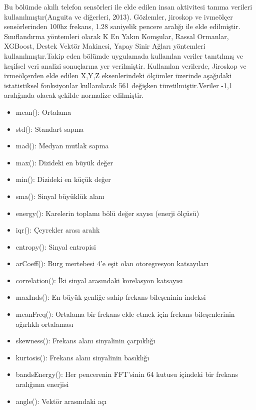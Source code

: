 \documentclass[12pt,twoside]{deuthesis}
\providecommand{\tightlist}{%
  \setlength{\itemsep}{0pt}\setlength{\parskip}{0pt}}
\begin{document}
Bu bölümde akıllı telefon sensörleri ile elde edilen insan aktivitesi tanıma verileri kullanılmıştır(Anguita ve diğerleri, 2013). Gözlemler, jiroskop ve ivmeölçer sensörlerinden 100hz frekans, 1.28 saniyelik pencere aralığı ile elde edilmiştir.
Sınıflandırma yöntemleri olarak K En Yakın Komşular, Rassal Ormanlar, XGBoost, Destek Vektör Makinesi, Yapay Sinir Ağları yöntemleri kullanılmıştır.Takip eden bölümde uygulamada kullanılan veriler tanıtılmış ve keşifsel veri analizi sonuçlarına yer verilmiştir.
Kullanılan verilerde, Jiroskop ve ivmeölçerden elde edilen X,Y,Z eksenlerindeki ölçümler üzerinde aşağıdaki istatistiksel fonksiyonlar kullanılarak 561 değişken türetilmiştir.Veriler -1,1 aralığında olacak şekilde normalize edilmiştir.
\begin{itemize}
\tightlist
\item
  mean(): Ortalama
\item
  std(): Standart sapma
\item
  mad(): Medyan mutlak sapma
\item
  max(): Dizideki en büyük değer
\item
  min(): Dizideki en küçük değer
\item
  sma(): Sinyal büyüklük alanı
\item
  energy(): Karelerin toplamı bölü değer sayısı (enerji ölçüsü)
\item
  iqr(): Çeyrekler arası aralık
\item
  entropy(): Sinyal entropisi
\item
  arCoeff(): Burg mertebesi 4'e eşit olan otoregresyon katsayıları
\item
  correlation(): İki sinyal arasındaki korelasyon katsayısı
\item
  maxInds(): En büyük genliğe sahip frekans bileşeninin indeksi
\item
  meanFreq(): Ortalama bir frekans elde etmek için frekans bileşenlerinin ağırlıklı ortalaması
\item
  skewness(): Frekans alanı sinyalinin çarpıklığı
\item
  kurtosis(): Frekans alanı sinyalinin basıklığı
\item
  bandsEnergy(): Her pencerenin FFT'sinin 64 kutusu içindeki bir frekans aralığının enerjisi
\item
  angle(): Vektör arasındaki açı
\end{itemize}
\end{document}
